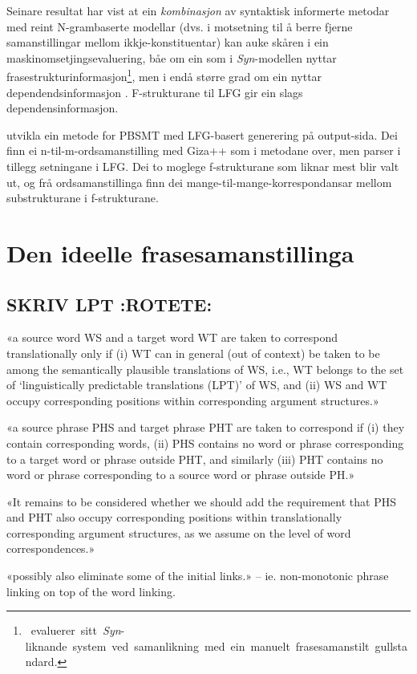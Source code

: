 \documentclass[11pt,a4paper,oneside,draft]{book}
\begin{document}
Seinare resultat har vist at ein \emph{kombinasjon} av syntaktisk informerte
metodar med reint N-grambaserte modellar (dvs. i motsetning til å
berre fjerne samanstillingar mellom ikkje-konstituentar) kan auke
skåren i ein maskinomsetjingsevaluering, båe om ein som i \emph{Syn}-modellen
nyttar
frasestrukturinformasjon\footnote{\citet{samuelsson2007apa}~evaluerer~sitt~\emph{Syn}-liknande~system~ved~samanlikning~med~ein~manuelt~frasesamanstilt~gullstandard.},
men i endå større grad om ein nyttar dependendsinformasjon
\citep{hearne2008ccd}. F-strukturane til LFG gir ein slags
dependensinformasjon.

\citet{riezler2006gmt} utvikla ein metode for PBSMT med LFG-basert
generering på output-sida. Dei finn ei n-til-m-ordsamanstilling med
Giza++ som i metodane over, men parser i tillegg setningane i LFG. Dei
to moglege f-strukturane som liknar mest blir valt ut, og frå
ordsamanstillinga finn dei mange-til-mange-korrespondansar mellom
substrukturane i f-strukturane.

\chapter{Den ideelle frasesamanstillinga}
\label{sec-3}

\section{\textbf{SKRIV} LPT \textbf{:ROTETE:}}
\label{sec-3.1}

«a source word WS and a target word WT are taken to correspond
translationally only if (i) WT can in general (out of context) be
taken to be among the semantically plausible translations of WS, i.e.,
WT belongs to the set of `linguistically predictable translations
(LPT)' of WS, and (ii) WS and WT occupy corresponding positions within
corresponding argument structures.»

«a source phrase PHS and target phrase PHT are taken to correspond if
(i) they contain corresponding words, (ii) PHS contains no word or
phrase corresponding to a target word or phrase outside PHT, and
similarly (iii) PHT contains no word or phrase corresponding to a
source word or phrase outside PH.»

«It remains to be considered whether we should add the requirement
that PHS and PHT also occupy corresponding positions within
translationally corresponding argument structures, as we assume on the
level of word correspondences.»

«possibly also eliminate some of the initial links.» --
ie. non-monotonic phrase linking on top of the word linking.
\end{document}
